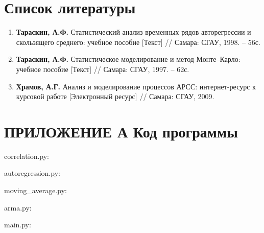 \documentclass[12pt, fleqn]{article}
\begin{document}
\section*{Список литературы}
{
	\begin{enumerate}
		\item {\textbf{Тараскин, А.Ф.} Статистический анализ временных рядов авторегрессии и скользящего среднего: учебное пособие [Текст] // Самара: СГАУ, 1998. – 56с.}
		\item {\textbf{Тараскин, А.Ф.} Статистическое моделирование и метод Монте–Карло: учебное пособие [Текст] // Самара: СГАУ, 1997. – 62с.}
		\item {\textbf{Храмов, А.Г.} Анализ и моделирование процессов АРСС: интернет-ресурс к курсовой работе [Электронный ресурс] // Самара: СГАУ, 2009.}
	\end{enumerate}
}
			
			  
			  
			  
\newpage
{}
{}
\section*{ПРИЛОЖЕНИЕ А Код программы}

correlation.py:


\newpage
autoregression.py:


\newpage 
moving\_average.py:


\newpage 
arma.py:


\newpage
main.py:

			
			
\newpage
{}
{}
\end{document}
